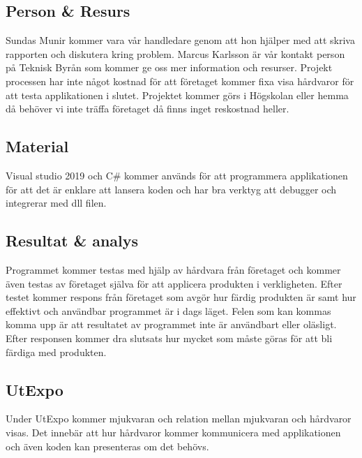 \documentclass{article}
\begin{document}
\subsection{Person \& Resurs}
Sundas Munir kommer vara vår handledare genom att hon hjälper med att skriva rapporten och diskutera kring problem. Marcus Karlsson är vår kontakt person på Teknisk Byrån som kommer ge oss mer information och resurser. Projekt processen har inte något kostnad för att företaget kommer fixa visa hårdvaror för att testa applikationen i slutet. Projektet kommer görs i Högskolan eller hemma då behöver vi inte träffa företaget då finns inget reskostnad heller. \newline
\subsection{Material}
Visual studio 2019 och C\# kommer används för att programmera applikationen för att det är enklare att lansera koden och har bra verktyg att debugger och integrerar med dll filen.\newline
\subsection{Resultat \& analys}
Programmet kommer testas med hjälp av hårdvara från företaget och kommer även testas av företaget själva för att applicera produkten i verkligheten. Efter testet kommer respons från företaget som avgör hur färdig produkten är samt hur effektivt och användbar programmet är i dags läget. Felen som kan kommas komma upp är att resultatet av programmet inte är användbart eller oläsligt. Efter responsen kommer dra slutsats hur mycket som måste göras för att bli färdiga med produkten.
\subsection{UtExpo}
Under UtExpo kommer mjukvaran och relation mellan mjukvaran och hårdvaror visas. Det innebär att hur hårdvaror kommer kommunicera med applikationen och även koden kan presenteras om det behövs.\newline
\newpage
\end{document}
